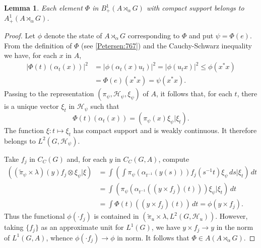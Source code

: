 \documentclass{book}
\newtheorem{lemma}[definition]{Lemma}
\begin{document}
\begin{lemma}\label{Petersen:776}
  Each element \(\Phi\) in \(B_+^1(A\rtimes_\alpha G)\) with compact support belongs to \(A_+^1(A\rtimes_\alpha G)\).
\end{lemma}
\begin{proof}
  Let \(\phi\) denote the state of \(A\rtimes_\alpha G\) corresponding to \(\Phi\) and put
  \(\psi=\Phi(e)\). From the definition of \(\Phi\) (see \ref{Petersen:767}) and the Cauchy-Schwarz
  inequality we have, for each \(x\) in \(A\),
  \begin{align*}
    |\Phi(t)(\alpha_t(x))|^2&=|\phi(\alpha_t(x)u_t)|^2=|\phi(u_t x)|^2\leq\phi(x^* x)\\
    &=\Phi(e)(x^* x)=\psi(x^* x).
  \end{align*} 
  Passing to the representation \((\pi_\psi,\mathcal{H}_\psi,\xi_\psi)\) of \(A\), it follows that, 
  for each \(t\), there is a unique vector \(\xi_t\) in \(\mathcal{H}_\psi\) such that
  \[
    \Phi(t)(\alpha_t(x))=(\pi_\psi(x)\xi_\psi|\xi_t).
  \]
  The function \(\xi:t\mapsto\xi_t\) has compact support and is weakly continuous. It therefore 
  belongs to \(L^2(G,\mathcal{H}_\psi)\).\par
  Take \(f_j\) in \(C_C(G)\) and, for each \(y\) in \(C_C(G,A)\), compute
  \begin{align*}
    ((\tilde{\pi}_\psi\times\lambda)(y)f_j\otimes\xi_\psi|\xi)&=\int\left(\int\pi_\psi(\alpha_{t^{-1}}(y(s)))f_j(s^{-1}t)\xi_\psi\,ds|\xi_t\right)\,dt\\
    &=\int(\pi_\psi(\alpha_{t^{-1}}((y\times f_j)(t)))\xi_\psi|\xi_t)\,dt\\
    &=\int\Phi(t)((y\times f_j)(t))\,dt=\phi(y\times f_j).
  \end{align*}
  Thus the functional \(\phi(\cdot f_j)\) is contained in \((\tilde{\pi}_u\times\lambda,L^2(G,\mathcal{H}_u))\).
  However, taking \(\{f_j\}\) as an approximate unit for \(L^1(G)\), we have \(y\times f_j\rightarrow y\) in the norm of \(L^1(G,A)\),
  whence \(\phi(\cdot f_j)\rightarrow \phi\) in norm. It follows that \(\Phi\in A(A\rtimes_\alpha G)\).
\end{proof}
\end{document}
